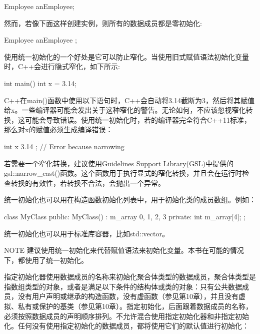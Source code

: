 \begin{cpp}
Employee anEmployee;
\end{cpp}

然而，若像下面这样创建实例，则所有的数据成员都是零初始化:

\begin{cpp}
Employee anEmployee { };
\end{cpp}

使用统一初始化的一个好处是它可以防止窄化。当使用旧式赋值语法初始化变量时，C++会进行隐式窄化，如下所示:

\begin{cpp}
int main()
{
    int x = 3.14;
}
\end{cpp}

C++在main()函数中使用以下语句时，C++会自动将3.14截断为3，然后将其赋值给x。一些编译器可能会发出关于这种窄化的警告。无论如何，不应该忽视窄化转换，这可能会导致错误。使用统一初始化时，若的编译器完全符合C++11标准，那么对x的赋值必须生成编译错误：

\begin{cpp}
int x { 3.14 }; // Error because narrowing
\end{cpp}

若需要一个窄化转换，建议使用Guidelines Support Library(GSL)中提供的gsl::narrow\_cast()函数。这个函数用于执行显式的窄化转换，并且会在运行时检查转换的有效性，若转换不合法，会抛出一个异常。

统一初始化也可以用在构造函数初始化列表中，用于初始化类的成员数组。例如：

\begin{cpp}
class MyClass
{
    public:
        MyClass()
            : m_array { 0, 1, 2, 3 }
        {
        }
    private:
        int m_array[4];
};
\end{cpp}

统一初始化也可以用于标准库容器，比如std::vector。

\begin{myNotic}{NOTE}
建议使用统一初始化来代替赋值语法来初始化变量。本书在可能的情况下，都使用了统一初始化。
\end{myNotic}


指定初始化器使用数据成员的名称来初始化聚合体类型的数据成员，聚合体类型是指数组类型的对象，或者是满足以下条件的结构体或类的对象：只有公共数据成员，没有用户声明或继承的构造函数，没有虚函数（参见第10章），并且没有虚拟、私有或保护的基类（参见第10章）。指定初始化，后面跟着数据成员的名称，必须按照数据成员的声明顺序排列。不允许混合使用指定初始化器和非指定初始化。任何没有使用指定初始化的数据成员，都将使用它们的默认值进行初始化：

